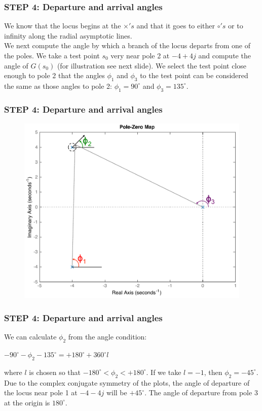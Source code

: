 \begin{frame}
\frametitle{STEP 4: Departure and arrival angles}
\justify
	We know that the locus begins at the $\times's$ and that it goes to either $\circ's$ or to infinity along the radial asymptotic lines.\\
	\vspace{1em}
	We next compute the angle by which a branch of the locus departs from one of the poles. We take a test point $s_0$ very near pole 2 at $-4+4j$ and compute the angle of $G(s_0)$ (for illustration see next slide). We select the test point close enough to pole 2 that the angles $\phi_1$ and $\phi_3$ to the test point can be considered the same as those angles to pole 2: $\phi_1 = 90^{\circ}$ and $\phi_3 = 135^{\circ}$. 
\end{frame}

\begin{frame}
\frametitle{STEP 4: Departure and arrival angles}
	\begin{figure}
		\centering
		\includegraphics[width=0.7\linewidth]{how_to_draw_ex4}
	\end{figure}
\end{frame}

\begin{frame}
\frametitle{STEP 4: Departure and arrival angles}	
	\begin{exampleblock}{}
	We can calculate $\phi_2$ from the angle condition:
	\begin{center}
		$-90^{\circ} - \phi_2 - 135^{\circ} = +180^{\circ} + 360^{\circ}l$
	\end{center}
	where $l$ is chosen so that $-180^{\circ} < \phi_2 < +180^{\circ}$. If we take $l = -1$, then $\phi_2 = -45^{\circ}$.\\
	\vspace{1em}
	Due to the complex conjugate symmetry of the plots, the angle of departure of the locus near pole 1 at $-4 - 4j$ will be $+45^{\circ}$. The angle of departure from pole 3 at the origin is $180^{\circ}$.
	\end{exampleblock}
\end{frame}

